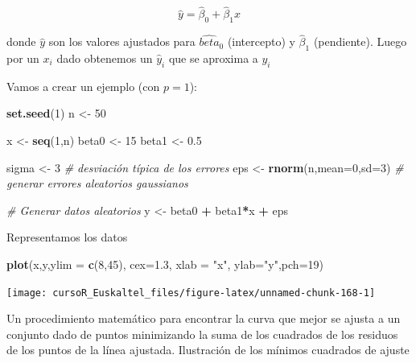 \documentclass[]{book}
\newenvironment{Shaded}{\begin{snugshade}}{\end{snugshade}}
\newcommand{\KeywordTok}[1]{\textcolor[rgb]{0.13,0.29,0.53}{\textbf{#1}}}
\newcommand{\DataTypeTok}[1]{\textcolor[rgb]{0.13,0.29,0.53}{#1}}
\newcommand{\DecValTok}[1]{\textcolor[rgb]{0.00,0.00,0.81}{#1}}
\newcommand{\FloatTok}[1]{\textcolor[rgb]{0.00,0.00,0.81}{#1}}
\newcommand{\StringTok}[1]{\textcolor[rgb]{0.31,0.60,0.02}{#1}}
\newcommand{\CommentTok}[1]{\textcolor[rgb]{0.56,0.35,0.01}{\textit{#1}}}
\newcommand{\OperatorTok}[1]{\textcolor[rgb]{0.81,0.36,0.00}{\textbf{#1}}}
\newcommand{\NormalTok}[1]{#1}
\begin{document}
\[
         \hat{y} = \hat{\beta}_0 + \hat{\beta}_1 x
\]

donde \(\hat y\) son los valores ajustados para \(\hat{beta}_0\)
(intercepto) y \(\hat{\beta}_1\) (pendiente). Luego por un \(x_i\) dado
obtenemos un \(\hat{y}_i\) que se aproxima a \(y_i\)

Vamos a crear un ejemplo (con \(p=1\)):

\begin{Shaded}
\begin{Highlighting}[]
\KeywordTok{set.seed}\NormalTok{(}\DecValTok{1}\NormalTok{)}
\NormalTok{n <-}\StringTok{ }\DecValTok{50} 

\NormalTok{x <-}\StringTok{ }\KeywordTok{seq}\NormalTok{(}\DecValTok{1}\NormalTok{,n)}
\NormalTok{ beta0 <-}\StringTok{ }\DecValTok{15}
\NormalTok{ beta1 <-}\StringTok{ }\FloatTok{0.5}

\NormalTok{sigma <-}\StringTok{ }\DecValTok{3} \CommentTok{# desviación típica de los errores}
\NormalTok{eps <-}\StringTok{ }\KeywordTok{rnorm}\NormalTok{(n,}\DataTypeTok{mean=}\DecValTok{0}\NormalTok{,}\DataTypeTok{sd=}\DecValTok{3}\NormalTok{) }\CommentTok{# generar errores aleatorios gaussianos}

\CommentTok{# Generar datos aleatorios}
\NormalTok{ y <-}\StringTok{ }\NormalTok{beta0 }\OperatorTok{+}\StringTok{ }\NormalTok{beta1}\OperatorTok{*}\NormalTok{x  }\OperatorTok{+}\StringTok{  }\NormalTok{eps}
\end{Highlighting}
\end{Shaded}

Representamos los datos

\begin{Shaded}
\begin{Highlighting}[]
\KeywordTok{plot}\NormalTok{(x,y,}\DataTypeTok{ylim =} \KeywordTok{c}\NormalTok{(}\DecValTok{8}\NormalTok{,}\DecValTok{45}\NormalTok{), }\DataTypeTok{cex=}\FloatTok{1.3}\NormalTok{, }\DataTypeTok{xlab =} \StringTok{"x"}\NormalTok{, }\DataTypeTok{ylab=}\StringTok{"y"}\NormalTok{,}\DataTypeTok{pch=}\DecValTok{19}\NormalTok{)}
\end{Highlighting}
\end{Shaded}

\begin{center}\texttt{[image: cursoR\_Euskaltel\_files/figure-latex/unnamed-chunk-168-1]} \end{center}

Un procedimiento matemático para encontrar la curva que mejor se ajusta
a un conjunto dado de puntos minimizando la suma de los cuadrados de los
residuos de los puntos de la línea ajustada. Ilustración de los mínimos
cuadrados de ajuste
\end{document}
